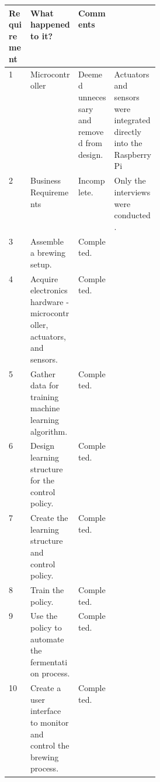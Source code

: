 \begin{center}
\begin{tabular}{lll p{0.3\linewidth} }
	Requirement & What happened to it? & Comments \\
	\hline
	1 & Microcontroller & Deemed unnecessary and removed from design. & Actuators and sensors  were integrated directly into the Raspberry Pi \\ 
	2 & Business Requirements & Incomplete. & Only the interviews were conducted. \\  
	3 & Assemble a brewing setup. & Completed.\\
	4 & Acquire electronics hardware - microcontroller, actuators, and sensors. & Completed.\\
	5 & Gather data for training machine learning algorithm. & Completed.\\
	6 & Design learning structure for the control policy. & Completed.\\
	7 & Create the learning structure and control policy. & Completed.\\
	8 & Train the policy. & Completed.\\
	9 & Use the policy to automate the fermentation process. & Completed.\\
	10 &  Create a user interface to monitor and control the brewing process. & Completed.\\
\end{tabular}
\end{center}


